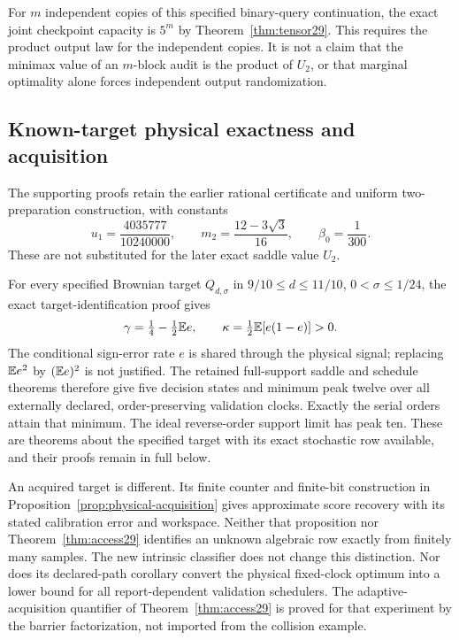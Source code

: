 For $m$ independent copies of this specified binary-query continuation,
the exact joint checkpoint capacity is $5^m$ by
Theorem~\ref{thm:tensor29}. This requires the product output law for
the independent copies. It is not a claim that the minimax value of
an $m$-block audit is the product of $U_2$, or that marginal optimality
alone forces independent output randomization.

\subsection{Known-target physical exactness and acquisition}
The supporting proofs retain the earlier rational certificate and
uniform two-preparation construction, with constants
\begin{equation}\label{eq:constants}
 u_1=\frac{4035777}{10240000},\qquad
 m_2=\frac{12-3\sqrt3}{16},\qquad \beta_0=\frac1{300}.
\end{equation}
These are not substituted for the later exact saddle value $U_2$.

For every specified Brownian target $Q_{d,\sigma}$ in
$9/10\le d\le11/10$, $0<\sigma\le1/24$, the exact target-identification
proof gives
\[
 \gamma=\tfrac14-\tfrac12\mathbb E e,
 \qquad \kappa=\tfrac12\mathbb E[e(1-e)]>0.
\]
The conditional sign-error rate $e$ is shared through the physical
signal; replacing $\mathbb E e^2$ by $(\mathbb E e)^2$ is not justified.
The retained full-support saddle and schedule theorems therefore give
five decision states and minimum peak twelve over all externally
declared, order-preserving validation clocks. Exactly the serial
orders attain that minimum. The ideal reverse-order support limit
has peak ten. These are theorems about the specified target with its
exact stochastic row available, and their proofs remain in full below.

An acquired target is different. Its finite counter and finite-bit
construction in Proposition~\ref{prop:physical-acquisition} gives
approximate score recovery with its stated calibration error and
workspace. Neither that proposition nor Theorem~\ref{thm:access29}
identifies an unknown algebraic row exactly from finitely many samples.
The new intrinsic classifier does not change this distinction. Nor
does its declared-path corollary convert the physical fixed-clock
optimum into a lower bound for all report-dependent validation schedulers.
The adaptive-acquisition quantifier of Theorem~\ref{thm:access29} is
proved for that experiment by the barrier factorization, not imported
from the collision example.
